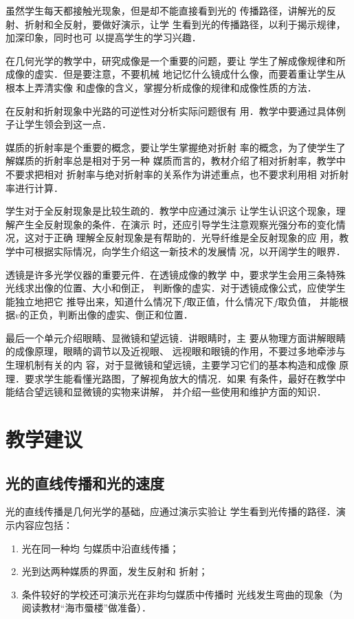 虽然学生每天都接触光现象，但是却不能直接看到光的
传播路径，讲解光的反射、折射和全反射，要做好演示，让学
生看到光的传播路径，以利于揭示规律，加深印象，同时也可
以提高学生的学习兴趣．

在几何光学的教学中，研究成像是一个重要的问题，要让
学生了解成像规律和所成像的虚实．但是要注意，不要机械
地记忆什么镜成什么像，而要着重让学生从根本上弄清实像
和虚像的含义，掌握分析成像的规律和成像性质的方法．

在反射和折射现象中光路的可逆性对分析实际问题很有
用．教学中要通过具体例子让学生领会到这一点．

媒质的折射率是个重要的概念，要让学生掌握绝对折射
率的概念，为了使学生了解媒质的折射率总是相对于另一种
媒质而言的，教材介绍了相对折射率，教学中不要求把相对
折射率与绝对折射率的关系作为讲述重点，也不要求利用相
对折射率进行计算．

学生对于全反射现象是比较生疏的．教学中应通过演示
让学生认识这个现象，理解产生全反射现象的条件．在演示
时，还应引导学生注意观察光强分布的变化情况，这对于正确
理解全反射现象是有帮助的．光导纤维是全反射现象的应
用，教学中可根据实际情况，向学生介绍这一新技术的发展情
况，以开阔学生的眼界．

透镜是许多光学仪器的重要元件．在透镜成像的教学
中，要求学生会用三条特殊光线求出像的位置、大小和倒正，
判断像的虚实．对于透镜成像公式，应使学生能独立地把它
推导出来，知道什么情况下$f$取正值，什么情况下$f$取负值，
并能根据$v$的正负，判断出像的虚实、倒正和位置．

最后一个单元介绍眼睛、显微镜和望远镜．讲眼睛时，主
要从物理方面讲解眼睛的成像原理，眼睛的调节以及近视眼、
远视眼和眼镜的作用，不要过多地牵涉与生理机制有关的内
容，对于显微镜和望远镜，主要学习它们的基本构造和成像
原理．要求学生能看懂光路图，了解视角放大的情况．如果
有条件，最好在教学中能结合望远镜和显微镜的实物来讲解，
并介绍一些使用和维护方面的知识．

\section{教学建议}
\subsection{光的直线传播和光的速度}
光的直线传播是几何光学的基础，应通过演示实验让
学生看到光传播的路径．演示内容应包括：
\begin{enumerate}
\item 光在同一种均
匀媒质中沿直线传播；    \item 光到达两种媒质的界面，发生反射和
折射；    \item 条件较好的学校还可演示光在非均匀媒质中传播时
光线发生弯曲的现象（为阅读教材“海市蜃楼”做准备）．
\end{enumerate}



